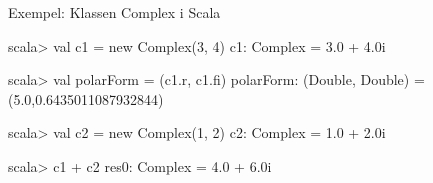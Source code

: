 \begin{Slide}{Exempel: Klassen Complex i Scala}\SlideFontSmall
{}

\begin{REPL}
scala> val c1 = new Complex(3, 4)
c1: Complex = 3.0 + 4.0i

scala> val polarForm = (c1.r, c1.fi)
polarForm: (Double, Double) = (5.0,0.6435011087932844)

scala> val c2 = new Complex(1, 2)
c2: Complex = 1.0 + 2.0i

scala> c1 + c2
res0: Complex = 4.0 + 6.0i
\end{REPL}

\end{Slide}

